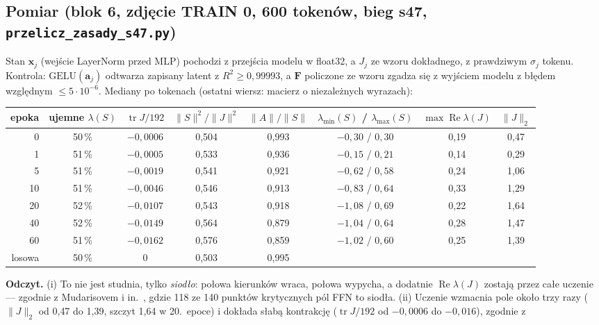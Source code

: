 \documentclass[a4paper,11pt]{article}
\newcommand{\GELU}{\mathrm{GELU}}
\begin{document}
\subsection*{Pomiar (blok 6, zdjęcie TRAIN 0, 600 tokenów, bieg s47, \texttt{przelicz\_zasady\_s47.py})}
Stan $\bm x_j$ (wejście LayerNorm przed MLP) pochodzi z przejścia modelu w float32, a $J_j$ ze wzoru dokładnego, z prawdziwym
$\sigma_j$ tokenu. Kontrola: $\GELU(\bm a_j)$ odtwarza zapisany latent z $R^2\ge0{,}99993$, a $\bm F$ policzone ze wzoru zgadza się
z wyjściem modelu z błędem względnym $\le5\cdot10^{-6}$. Mediany po tokenach (ostatni wiersz: macierz o niezależnych wyrazach):
\begin{center}\small
\begin{tabular}{rccccccc}\toprule
epoka & ujemne $\lambda(S)$ & $\operatorname{tr}J/192$ & $\lVert S\rVert^2/\lVert J\rVert^2$ & $\lVert A\rVert/\lVert S\rVert$ & $\lambda_{\min}(S)$ / $\lambda_{\max}(S)$ & $\max\operatorname{Re}\lambda(J)$ & $\lVert J\rVert_2$\\\midrule
0 & 50\,\% & $-0{,}0006$ & 0{,}504 & 0{,}993 & $-0{,}30$ / $0{,}30$ & 0{,}19 & 0{,}47\\
1 & 51\,\% & $-0{,}0005$ & 0{,}533 & 0{,}936 & $-0{,}15$ / $0{,}21$ & 0{,}14 & 0{,}29\\
5 & 51\,\% & $-0{,}0019$ & 0{,}541 & 0{,}921 & $-0{,}62$ / $0{,}58$ & 0{,}24 & 1{,}06\\
10 & 51\,\% & $-0{,}0046$ & 0{,}546 & 0{,}913 & $-0{,}83$ / $0{,}64$ & 0{,}33 & 1{,}29\\
20 & 52\,\% & $-0{,}0107$ & 0{,}543 & 0{,}918 & $-1{,}08$ / $0{,}69$ & 0{,}22 & 1{,}64\\
40 & 52\,\% & $-0{,}0149$ & 0{,}564 & 0{,}879 & $-1{,}04$ / $0{,}64$ & 0{,}28 & 1{,}47\\
60 & 51\,\% & $-0{,}0162$ & 0{,}576 & 0{,}859 & $-1{,}02$ / $0{,}60$ & 0{,}25 & 1{,}39\\\midrule
losowa & 50\,\% & 0 & 0{,}503 & 0{,}995 & & & \\\bottomrule
\end{tabular}
\end{center}
\textbf{Odczyt.} (i) To nie jest studnia, tylko \emph{siodło}: połowa kierunków wraca, połowa wypycha, a dodatnie
$\operatorname{Re}\lambda(J)$ zostają przez całe uczenie --- zgodnie z Mudarisovem i in.~\cite{mudarisov26}, gdzie 118 ze 140
punktów krytycznych pól FFN to siodła. (ii) Uczenie wzmacnia pole około trzy razy ($\lVert J\rVert_2$ od 0{,}47 do 1{,}39, szczyt 1{,}64
w 20.~epoce) i dokłada słabą kontrakcję ($\operatorname{tr}J/192$ od $-0{,}0006$ do $-0{,}016$), zgodnie z
\end{document}
